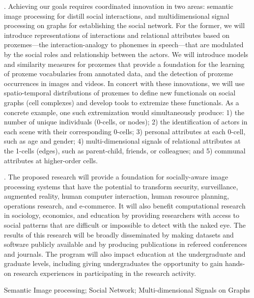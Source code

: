 . Achieving our goals requires coordinated innovation in two areas: semantic image processing for distill social interactions, and multidimensional signal processing on graphs for establishing the social network.  For the former, we will introduce representations of interactions and relational attributes based on proxemes---the interaction-analogy to phonemes in speech---that are modulated by the social roles and relationship between the actors. We will introduce models and similarity measures for proxemes that provide a foundation for the learning of proxeme vocabularies from annotated data, and the detection of proxeme occurrences in images and videos. In concert with these innovations, we will use spatio-temporal distributions of proxemes to define new functionals on social graphs (cell complexes) and develop tools to extremize these functionals. As a concrete example, one such extremization would simultaneously produce: 1) the number of unique individuals (0-cells, or nodes); 2) the identification of actors in each scene with their corresponding 0-cells; 3) personal attributes at each 0-cell, such as age and gender; 4) multi-dimensional signals of relational attributes at the 1-cells (edges), such as parent-child, friends, or colleagues; and 5) communal attributes at higher-order cells.

. The proposed research will provide a foundation for socially-aware image processing systems that have the potential to transform security, surveillance, augmented reality, human computer interaction, human resource planning, operations research, and e-commerce. It will also benefit computational research in sociology, economics, and education by providing researchers with access to social patterns that are difficult or impossible to detect with the naked eye. The results of this research will be broadly disseminated by making datasets and software publicly available and by producing publications in refereed conferences and journals. The program will also impact education at the undergraduate and graduate levels, including giving undergraduates the opportunity to gain hands-on research experiences in participating in the research activity. 

 Semantic Image processing; Social Network; Multi-dimensional Signals on Graphs


